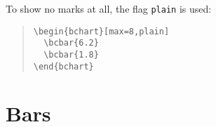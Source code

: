 \documentclass{article}
\begin{document}
To show no marks at all, the flag \texttt{plain} is used:
\begin{quote}\small
\begin{verbatim}
\begin{bchart}[max=8,plain]
  \bcbar{6.2}
  \bcbar{1.8}
\end{bchart}
\end{verbatim}
\end{quote}
\begin{quote}
\begin{bchart}[max=8,plain]
\end{bchart}
\end{quote}


\section{Bars}
\end{document}
